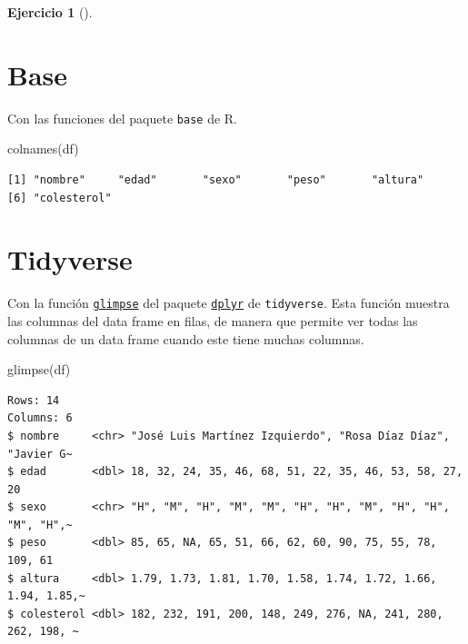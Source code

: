 \documentclass[
  a4paper,
]{scrreport}
\newenvironment{Shaded}{\begin{snugshade}}{\end{snugshade}}
\newcommand{\FunctionTok}[1]{\textcolor[rgb]{0.28,0.35,0.67}{#1}}
\newcommand{\NormalTok}[1]{\textcolor[rgb]{0.00,0.23,0.31}{#1}}
\theoremstyle{definition}
\newtheorem{exercise}{Ejercicio}[chapter]
\theoremstyle{remark}
\begin{document}
\begin{exercise}[]
\begin{enumerate}
  \begin{tcolorbox}[enhanced jigsaw, breakable, toptitle=1mm, colbacktitle=quarto-callout-tip-color!10!white, rightrule=.15mm, opacityback=0, opacitybacktitle=0.6, titlerule=0mm, coltitle=black, colframe=quarto-callout-tip-color-frame, colback=white, bottomtitle=1mm, leftrule=.75mm, toprule=.15mm, title=\textcolor{quarto-callout-tip-color}{\faLightbulb}\hspace{0.5em}{Solución}, arc=.35mm, bottomrule=.15mm, left=2mm]

  \section{Base}

  Con las funciones del paquete \texttt{base} de R.

\begin{Shaded}
\begin{Highlighting}[]
\FunctionTok{colnames}\NormalTok{(df)}
\end{Highlighting}
\end{Shaded}

\begin{verbatim}
[1] "nombre"     "edad"       "sexo"       "peso"       "altura"    
[6] "colesterol"
\end{verbatim}

  \section{Tidyverse}

  Con la función
  \href{https://dplyr.tidyverse.org/reference/glimpse.html?q=read_csv\#undefined}{\texttt{glimpse}}
  del paquete
  \href{https://dplyr.tidyverse.org/index.html}{\texttt{dplyr}} de
  \texttt{tidyverse}. Esta función muestra las columnas del data frame
  en filas, de manera que permite ver todas las columnas de un data
  frame cuando este tiene muchas columnas.

\begin{Shaded}
\begin{Highlighting}[]
\FunctionTok{glimpse}\NormalTok{(df)}
\end{Highlighting}
\end{Shaded}

\begin{verbatim}
Rows: 14
Columns: 6
$ nombre     <chr> "José Luis Martínez Izquierdo", "Rosa Díaz Díaz", "Javier G~
$ edad       <dbl> 18, 32, 24, 35, 46, 68, 51, 22, 35, 46, 53, 58, 27, 20
$ sexo       <chr> "H", "M", "H", "M", "M", "H", "H", "M", "H", "H", "M", "H",~
$ peso       <dbl> 85, 65, NA, 65, 51, 66, 62, 60, 90, 75, 55, 78, 109, 61
$ altura     <dbl> 1.79, 1.73, 1.81, 1.70, 1.58, 1.74, 1.72, 1.66, 1.94, 1.85,~
$ colesterol <dbl> 182, 232, 191, 200, 148, 249, 276, NA, 241, 280, 262, 198, ~
\end{verbatim}


\end{tcolorbox}
\end{enumerate}
\end{exercise}
\end{document}
